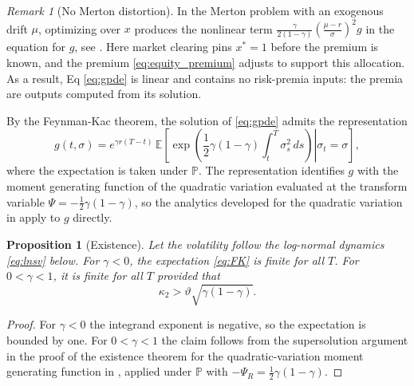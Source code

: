 \documentclass[11pt]{article}
\newtheorem{proposition}{Proposition}
\theoremstyle{remark}
\newtheorem{remark}{Remark}
\newcommand{\E}{\mathbb{E}}
\newcommand{\PP}{\mathbb{P}}
\begin{document}
\begin{remark}[No Merton distortion]\label{rem:linearity}
In the Merton problem with an exogenous drift $\mu$, optimizing over $x$ produces the nonlinear term $\frac{\gamma}{2(1-\gamma)}\left(\frac{\mu-r}{\sigma}\right)^{2}g$ in the equation for $g$, see \cite{Merton1971}. Here market clearing pins $x^{*}=1$ before the premium is known, and the premium \eqref{eq:equity_premium} adjusts to support this allocation. As a result, Eq \eqref{eq:gpde} is linear and contains no risk-premia inputs: the premia are outputs computed from its solution.
\end{remark}

By the Feynman-Kac theorem, the solution of \eqref{eq:gpde} admits the representation
\begin{equation}\label{eq:FK}
g(t,\sigma) = e^{\gamma r (T-t)}\, \E\left[ \left. \exp\left( \frac{1}{2}\gamma(1-\gamma) \int_{t}^{T} \sigma^{2}_{s}\, ds \right) \right| \sigma_{t}=\sigma \right],
\end{equation}
where the expectation is taken under $\PP$. The representation identifies $g$ with the moment generating function of the quadratic variation evaluated at the transform variable $\Psi = -\frac{1}{2}\gamma(1-\gamma)$, so the analytics developed for the quadratic variation in \cite{SeppRakhmonov2024} apply to $g$ directly.

\begin{proposition}[Existence]\label{prop:existence}
Let the volatility follow the log-normal dynamics \eqref{eq:lnsv} below. For $\gamma < 0$, the expectation \eqref{eq:FK} is finite for all $T$. For $0<\gamma<1$, it is finite for all $T$ provided that
\begin{equation}\label{eq:existence}
\kappa_{2} > \vartheta \sqrt{ \gamma(1-\gamma)}.
\end{equation}
\end{proposition}
\begin{proof}
For $\gamma<0$ the integrand exponent is negative, so the expectation is bounded by one. For $0<\gamma<1$ the claim follows from the supersolution argument in the proof of the existence theorem for the quadratic-variation moment generating function in \cite{SeppRakhmonov2024}, applied under $\PP$ with $-\Psi_{R} = \frac{1}{2}\gamma(1-\gamma)$.
\end{proof}
\end{document}
